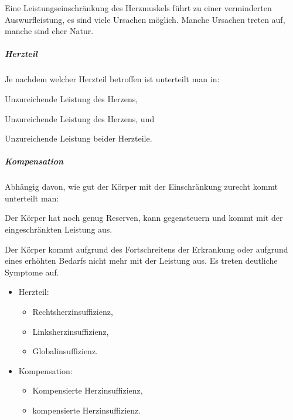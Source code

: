 
Eine Leistungseinschränkung des Herzmuskels führt zu einer verminderten
Auswurfleistung, es sind viele Ursachen möglich. Manche Ursachen treten
 auf, manche sind eher  Natur.  



{
\subparagraph{Herzteil} 
Je nachdem welcher Herzteil betroffen ist unterteilt man in:

\begin{compactdesc}
  \item[\T{Rechtsherzinsuffizienz}] Unzureichende Leistung des 
  Herzens,
  \item[\T{Linksherzinsuffizienz}]
  Unzureichende Leistung des  Herzens, und
  \item[\T{Globalinsuffizienz}] Unzureichende Leistung beider Herzteile.
\end{compactdesc}

\subparagraph{Kompensation}
Abhängig davon, wie gut der Körper mit der
Einschränkung zurecht kommt unterteilt man:

\begin{compactdesc}
  \item[\T{Kompensierte Herzinsuffizienz}] Der Körper hat noch
  genug Reserven, kann gegensteuern und kommt mit der
  eingeschränkten Leistung aus.
  \item[\T{\E{De}kompensierte Herzinsuffizienz}] Der Körper kommt aufgrund
  des Fortschreitens der Erkrankung oder aufgrund eines erhöhten
  Bedarfs nicht mehr mit der Leistung aus. Es treten deutliche
  Symptome auf.
\end{compactdesc}
}{
\begin{itemize}
  \item Herzteil:
  \begin{itemize}
    \item Rechtsherzinsuffizienz,
    \item Linksherzinsuffizienz,
    \item Globalinsuffizienz.
  \end{itemize}
  \item Kompensation:
  \begin{itemize}
    \item Kompensierte Herzinsuffizienz,
    \item {}kompensierte Herzinsuffizienz.
  \end{itemize}
\end{itemize}
}{}{}{}




